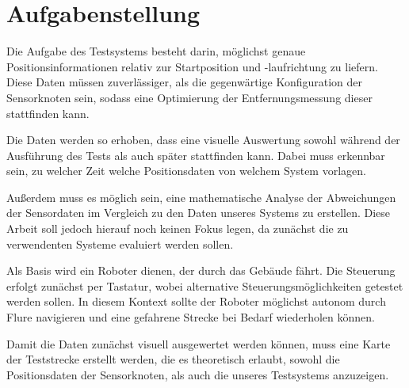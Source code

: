 \section{Aufgabenstellung}
\label{sec:aufgabenstellung}

Die Aufgabe des Testsystems besteht darin, möglichst genaue Positionsinformationen relativ zur Startposition und -laufrichtung zu liefern. Diese Daten müssen zuverlässiger, als die gegenwärtige Konfiguration der Sensorknoten sein, sodass eine Optimierung der Entfernungsmessung dieser stattfinden kann.

Die Daten werden so erhoben, dass eine visuelle Auswertung sowohl während der Ausführung des Tests als auch später stattfinden kann. Dabei muss erkennbar sein, zu welcher Zeit welche Positionsdaten von welchem System vorlagen.

Außerdem muss es möglich sein, eine mathematische Analyse der Abweichungen der Sensordaten im Vergleich zu den Daten unseres Systems zu erstellen. Diese Arbeit soll jedoch hierauf noch keinen Fokus legen, da zunächst die zu verwendenten Systeme evaluiert werden sollen.

Als Basis wird ein Roboter dienen, der durch das Gebäude fährt. Die Steuerung erfolgt zunächst per Tastatur, wobei alternative Steuerungsmöglichkeiten getestet werden sollen. In diesem Kontext sollte der Roboter möglichst autonom durch Flure navigieren und eine gefahrene Strecke bei Bedarf wiederholen können.

Damit die Daten zunächst visuell ausgewertet werden können, muss eine Karte der Teststrecke erstellt werden, die es theoretisch erlaubt, sowohl die Positionsdaten der Sensorknoten, als auch die unseres Testsystems anzuzeigen.